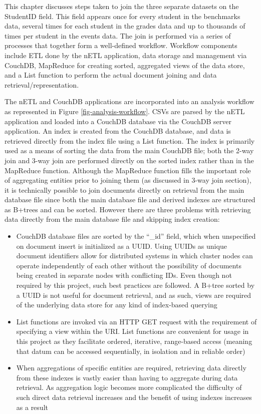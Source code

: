 \label{chapter-analysis}
This chapter discusses steps taken to join the three separate datasets on the StudentID field. This field appears once for every student in the benchmarks data, several times for each student in the grades data and up to thousands of times per student in the events data. The join is performed via a series of processes that together form a well-defined workflow. Workflow components include ETL done by the nETL application, data storage and management via CouchDB, MapReduce for creating sorted, aggregated views of the data store, and a List function to perform the actual document joining and data retrieval/representation.

The nETL and CouchDB applications are incorporated into an analysis workflow as represented in Figure \ref{fig-analysis-workflow}. CSVs are parsed by the nETL application and loaded into a CouchDB database via the CouchDB server application. An index is created from the CouchDB database, and data is retrieved directly from the index file using a List function. The index is primarily used as a means of sorting the data from the main CouchDB file; both the 2-way join and 3-way join are performed directly on the sorted index rather than in the MapReduce function. Although the MapReduce function fills the important role of aggregating entities prior to joining them (as discussed in 3-way join section), it is technically possible to join documents directly on retrieval from the main database file since both the main database file and derived indexes are structured as B+trees and can be sorted. However there are three problems with retrieving data directly from the main database file and skipping index creation:

\begin{itemize}
    \item CouchDB database files are sorted by the ``\_id'' field, which when unspecified on document insert is initialized as a UUID. Using UUIDs as unique document identifiers allow for distributed systems in which cluster nodes can operate independently of each other without the possibility of documents being created in separate nodes with conflicting IDs. Even though not required by this project, such best practices are followed. A B+tree sorted by a UUID is not useful for document retrieval, and as such, views are required of the underlying data store for any kind of index-based querying
    \item List functions are invoked via an HTTP GET request with the requirement of specifying a view within the URI. List functions are convenient for usage in this project as they facilitate ordered, iterative, range-based access (meaning that datum can be accessed sequentially, in isolation and in reliable order)
    \item When aggregations of specific entities are required, retrieving data directly from these indexes is vastly easier than having to aggregate during data retrieval. As aggregation logic becomes more complicated the difficulty of such direct data retrieval increases and the benefit of using indexes increases as a result
\end{itemize}

